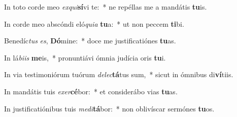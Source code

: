 \item In toto corde meo \textit{ex}\textit{qui}\textbf{sí}vi te:~* ne repéllas me a mandátis \textbf{tu}is.
\item In corde meo abscóndi eló\textit{qui}\textit{a} \textbf{tu}a:~* ut non peccem \textbf{ti}bi.
\item Benedíc\textit{tus} \textit{es}, \textbf{Dó}mine:~* doce me justificatiónes \textbf{tu}as.
\item In lá\textit{bi}\textit{is} \textbf{me}is,~* pronuntiávi ómnia judícia oris \textbf{tu}i.
\item In via testimoniórum tuórum \textit{de}\textit{lec}\textbf{tá}tus sum,~* sicut in ómnibus di\textbf{ví}tiis.
\item In mandátis tuis \textit{ex}\textit{er}\textbf{cé}bor:~* et considerábo vias \textbf{tu}as.
\item In justificatiónibus tuis \textit{me}\textit{di}\textbf{tá}bor:~* non oblivíscar sermónes \textbf{tu}os.
